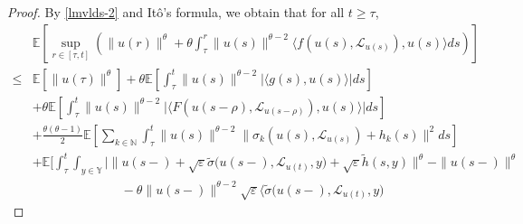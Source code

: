 \documentclass[11pt]{article}
\numberwithin{equation}{section}
\theoremstyle{plain}
\begin{document}
\begin{proof}
By \eqref{lmvlds-2}  and It\^o's formula, we obtain that for all $t \ge \tau$,
\begin{align}\label{uniform-1}
	  & \mathbb{E} 
	           \left[ \sup_{r \in [\tau, t]} 
	                         \left( \| u(r) \|^{\theta} 
	                                  + \theta
	                                           \int_{\tau}^{r}
	                                           	    \| u(s) \|^{\theta-2}
	                                                     \langle f(u(s), \mathcal{L}_{u(s)}), u(s) \rangle ds 
	                         \right)
          	   \right]  \nonumber\\
 \le & \mathbb{E}\left[ \| u(\tau) \|^{\theta} \right] 
          + \theta
	           \mathbb{E}
	                 \left[ \int_{\tau}^{t}
        	                           \| u(s) \|^{\theta-2}
	                                  \big| \langle g(s), u(s) \rangle \big| ds
	                \right]  \nonumber\\
	  & + \theta
	            \mathbb{E}
	                   \left[ \int_{\tau}^{t}
	                                     \| u(s) \|^{\theta-2}
	                                     \big| \langle F(u(s-\rho), \mathcal{L}_{u(s-\rho)}), u(s) \rangle \big| ds
	                  \right]  \nonumber\\
	  & + \frac{\theta (\theta-1) }{2}
	             \mathbb{E}
	                   \left[ \sum_{k \in \mathbb{N} } 
	                                   \int_{\tau}^{t}
	                                            \| u(s) \|^{\theta-2}
	                                            \| \sigma_k(u(s), \mathcal{L}_{u(s)}) + h_k(s) \|^{2} ds
	                   \right]  \nonumber\\
	  & + \mathbb{E}
	                \bigg[ \int_{\tau}^{t}
	                             \int_{y \in \mathbb{Y} }
	                             	 \Big| 
 	                                   \| u(s-)
 	                                      + \sqrt{\varepsilon} 
 	                                         \widetilde{\sigma}\big( u(s-), \mathcal{L}_{u(t)}, y \big)
 	                                      + \sqrt{\varepsilon} \widetilde{h}(s,y)
 	                                   \|^{\theta}
 	                                   - \|u(s-)\|^{\theta}   \nonumber\\
 	& \qquad\qquad\qquad\quad
 	                                   - \theta \|u(s-)\|^{\theta-2}
 	                                          \sqrt{\varepsilon}
 	                                                \big\langle
 	                                                    \widetilde{\sigma}\big(u(s-), \mathcal{L}_{u(t)}, y\big)

\end{align}
\end{proof}
\end{document}
